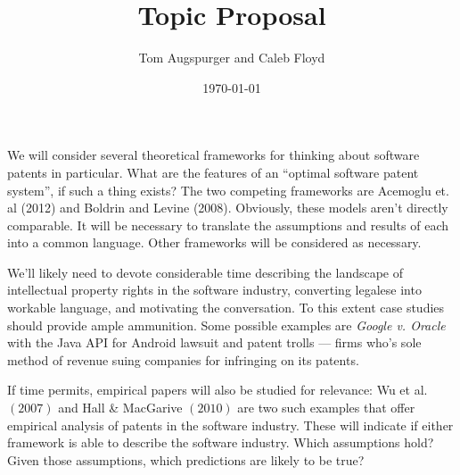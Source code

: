 \documentclass[11pt]{article}
\title{Topic Proposal}
\author{Tom Augspurger and Caleb Floyd}
\date{\today}
\begin{document}
\maketitle

We will consider several theoretical frameworks for thinking about software patents in particular.  What are the features of an ``optimal software patent system'', if such a thing exists? The two competing frameworks are Acemoglu et. al (2012) and Boldrin and Levine (2008).  Obviously, these models aren't directly comparable. It will be necessary to translate the assumptions and results of each into a common language. Other frameworks will be considered as necessary.

We'll likely need to devote considerable time describing the landscape of intellectual property rights in the software industry, converting legalese into workable language, and motivating the conversation. To this extent case studies should provide ample ammunition. Some possible examples are \emph{Google v. Oracle} with the Java API for Android lawsuit and patent trolls --- firms who's sole method of revenue suing companies for infringing on its patents.

If time permits, empirical papers will also be studied for relevance: Wu et al. $(2007)$ and Hall \& MacGarive $(2010)$ are two such examples that offer empirical analysis of patents in the software industry.  These will indicate if either framework is able to describe the software industry.  Which assumptions hold? Given those assumptions, which predictions are likely to be true?
\end{document}
